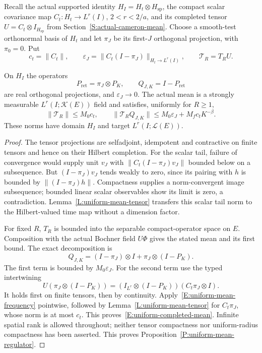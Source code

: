 Recall the actual supported identity $H_I=H_t\otimes H_{\mathrm{sp}}$,
the compact scalar covariance map $C_t:H_t\to L^r(I)$, $2<r<2/a$,
and its completed tensor $U=C_t\otimes I_{H_{\mathrm{sp}}}$ from
Section~\ref{S:actual-cameron-mean}.
Choose a smooth-test orthonormal basis of $H_t$ and let $\pi_J$
be its first-$J$ orthogonal projection, with $\pi_0=0$.
Put
\[
  c_t=\|C_t\|,\qquad
  \varepsilon_J=\|C_t(I-\pi_J)\|_{H_t\to L^r(I)},\qquad
  \mathcal T_R=T_RU .
\]

\begin{proposition}
  \label{P:uniform-mean-regulator}
  On $H_I$ the operators
  \[
    P_{\mathrm{ret}}=\pi_J\otimes P_K,\qquad
    Q_{J,K}=I-P_{\mathrm{ret}}
  \]
  are real orthogonal projections, and $\varepsilon_J\to0$.
  The actual mean is a strongly measurable
  $L^r(I;\mathcal K(E))$ field and satisfies, uniformly for $R\ge1$,
  \begin{equation}\label{E:uniform-completed-mean}
    \|\mathcal T_R\|\le M_0c_t,\qquad
    \|\mathcal T_RQ_{J,K}\|
    \le M_0\varepsilon_J+M_fc_tK^{-\beta}.
  \end{equation}
  These norms have domain $H_I$ and target $L^r(I;\mathcal L(E))$.
\end{proposition}

\begin{proof}
  The tensor projections are selfadjoint, idempotent and contractive
  on finite tensors and hence on their Hilbert completion.
  For the scalar tail, failure of convergence would supply unit
  $v_J$ with $\|C_t(I-\pi_J)v_J\|$ bounded below on a subsequence.
  But $(I-\pi_J)v_J$ tends weakly to zero, since its pairing with
  $h$ is bounded by $\|(I-\pi_J)h\|$.
  Compactness supplies a norm-convergent image subsequence; bounded
  linear scalar observables show its limit is zero, a contradiction.
  Lemma~\ref{L:uniform-mean-tensor} transfers this scalar tail norm
  to the Hilbert-valued time map without a dimension factor.

  For fixed $R$, $T_R$ is bounded into the separable compact-operator
  space on $E$. Composition with the actual Bochner field $U\Phi$
  gives the stated mean and its first bound.
  The exact decomposition is
  \[
    Q_{J,K}=(I-\pi_J)\otimes I+\pi_J\otimes(I-P_K).
  \]
  The first term is bounded by $M_0\varepsilon_J$.
  For the second term use the typed intertwining
  \[
    U(\pi_J\otimes(I-P_K))
    =(I_{L^r}\otimes(I-P_K))(C_t\pi_J\otimes I).
  \]
  It holds first on finite tensors, then by continuity.
  Apply~\eqref{E:uniform-mean-frequency} pointwise, followed by
  Lemma~\ref{L:uniform-mean-tensor} for $C_t\pi_J$, whose norm
  is at most $c_t$. This proves~\eqref{E:uniform-completed-mean}.
  Infinite spatial rank is allowed throughout; neither tensor
  compactness nor uniform-radius compactness has been asserted.
  This proves Proposition~\ref{P:uniform-mean-regulator}.
\end{proof}

